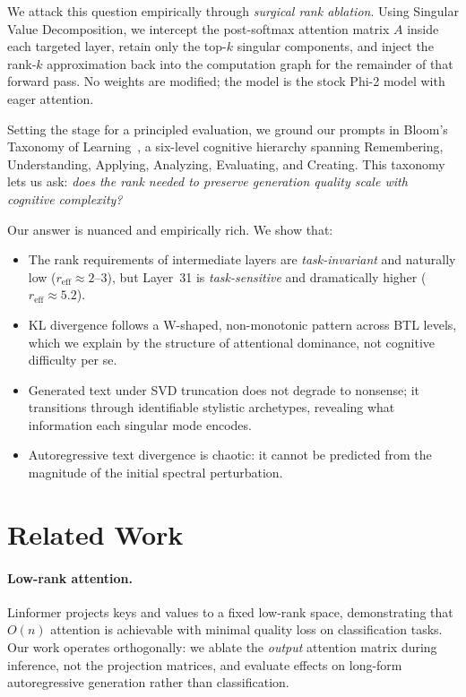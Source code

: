 \documentclass{article}
\begin{document}
We attack this question empirically through \emph{surgical rank ablation}.
Using Singular Value Decomposition, we intercept the post-softmax attention
matrix $A$ inside each targeted layer, retain only the top-$k$ singular components,
and inject the rank-$k$ approximation back into the computation graph for the
remainder of that forward pass.  No weights are modified; the model is the
stock Phi-2 model with eager attention.

Setting the stage for a principled evaluation, we ground our prompts in
Bloom's Taxonomy of Learning~\citep{bloom1956taxonomy}, a six-level cognitive
hierarchy spanning Remembering, Understanding, Applying, Analyzing, Evaluating,
and Creating.  This taxonomy lets us ask: \emph{does the rank needed to preserve
generation quality scale with cognitive complexity?}

Our answer is nuanced and empirically rich.  We show that:
\begin{itemize}[leftmargin=1.5em, itemsep=0pt]
  \item The rank requirements of intermediate layers are \emph{task-invariant}
        and naturally low ($r_{\text{eff}}\!\approx\!2$--3), but Layer~31 is
        \emph{task-sensitive} and dramatically higher ($r_{\text{eff}}\!\approx\!5.2$).
  \item KL divergence follows a W-shaped, non-monotonic pattern across BTL levels,
        which we explain by the structure of attentional dominance, not cognitive
        difficulty per se.
  \item Generated text under SVD truncation does not degrade to nonsense;
        it transitions through identifiable stylistic archetypes, revealing
        what information each singular mode encodes.
  \item Autoregressive text divergence is chaotic: it cannot be predicted from
        the magnitude of the initial spectral perturbation.
\end{itemize}

\section{Related Work}
\label{sec:related}

\paragraph{Low-rank attention.}
Linformer \citep{wang2020linformer} projects keys and values to a fixed low-rank
space, demonstrating that $O(n)$ attention is achievable with minimal quality loss
on classification tasks.  Our work operates orthogonally: we ablate the \emph{output}
attention matrix during inference, not the projection matrices, and evaluate effects
on long-form autoregressive generation rather than classification.
\end{document}
